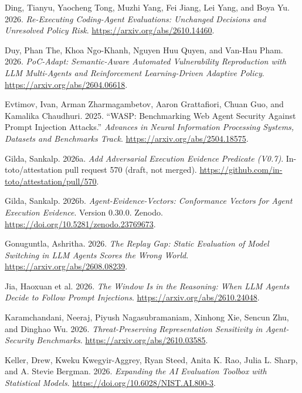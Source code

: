 \documentclass[
  american,
  10pt,
  a4paper,
]{article}
\newlength{\cslhangindent}
\newenvironment{CSLReferences}[2] %
 {\begin{list}{}{%
  \setlength{\itemindent}{0pt}
  \setlength{\leftmargin}{0pt}
  \setlength{\parsep}{0pt}
  \ifodd #1
   \setlength{\leftmargin}{\cslhangindent}
   \setlength{\itemindent}{-1\cslhangindent}
  \fi
  \setlength{\itemsep}{#2\baselineskip}}}
 {\end{list}}
\begin{document}
\begin{CSLReferences}{1}{1}
Ding, Tianyu, Yaocheng Tong, Muzhi Yang, Fei Jiang, Lei Yang, and Boya
Yu. 2026. \emph{Re-Executing Coding-Agent Evaluations: Unchanged
Decisions and Unresolved Policy Risk}.
\url{https://arxiv.org/abs/2610.14460}.

Duy, Phan The, Khoa Ngo-Khanh, Nguyen Huu Quyen, and Van-Hau Pham. 2026.
\emph{PoC-Adapt: Semantic-Aware Automated Vulnerability Reproduction
with LLM Multi-Agents and Reinforcement Learning-Driven Adaptive
Policy}. \url{https://arxiv.org/abs/2604.06618}.

Evtimov, Ivan, Arman Zharmagambetov, Aaron Grattafiori, Chuan Guo, and
Kamalika Chaudhuri. 2025. {``{WASP}: Benchmarking Web Agent Security
Against Prompt Injection Attacks.''} \emph{Advances in Neural
Information Processing Systems, Datasets and Benchmarks Track}.
\url{https://arxiv.org/abs/2504.18575}.

Gilda, Sankalp. 2026a. \emph{Add Adversarial Execution Evidence
Predicate (V0.7)}. In-toto/attestation pull request 570 (draft, not
merged). \url{https://github.com/in-toto/attestation/pull/570}.

Gilda, Sankalp. 2026b. \emph{Agent-Evidence-Vectors: Conformance Vectors
for Agent Execution Evidence}. Version 0.30.0. Zenodo.
\url{https://doi.org/10.5281/zenodo.23769673}.

Gonuguntla, Ashritha. 2026. \emph{The Replay Gap: Static Evaluation of
Model Switching in {LLM} Agents Scores the Wrong World}.
\url{https://arxiv.org/abs/2608.08239}.

{Jia, Haoxuan et al.} 2026. \emph{The Window Is in the Reasoning: When
{LLM} Agents Decide to Follow Prompt Injections}.
\url{https://arxiv.org/abs/2610.24048}.

Karamchandani, Neeraj, Piyush Nagasubramaniam, Xinhong Xie, Sencun Zhu,
and Dinghao Wu. 2026. \emph{Threat-Preserving Representation Sensitivity
in Agent-Security Benchmarks}. \url{https://arxiv.org/abs/2610.03585}.

Keller, Drew, Kweku Kwegyir-Aggrey, Ryan Steed, Anita K. Rao, Julia L.
Sharp, and A. Stevie Bergman. 2026. \emph{Expanding the AI Evaluation
Toolbox with Statistical Models}.
\url{https://doi.org/10.6028/NIST.AI.800-3}.


\end{CSLReferences}
\end{document}
